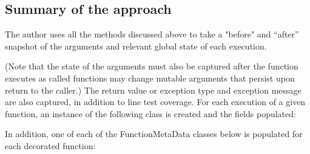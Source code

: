 \subsection{Summary of the approach}\label{sec:approach-internal-5}

The author uses all the methods discussed above to take a "before" and “after” 
snapshot of the arguments and relevant global state of each execution. 

(Note that the state of the arguments must also be captured after the function 
executes as called functions may change mutable arguments that persist upon 
return to the caller.) The return value or exception type and exception message
 are also captured, in addition to line test coverage. 
 For each execution of a given function, an instance of the 
 following class is created and the fields populated:



In addition, one of each of the FunctionMetaData classes below is populated for each decorated function:





